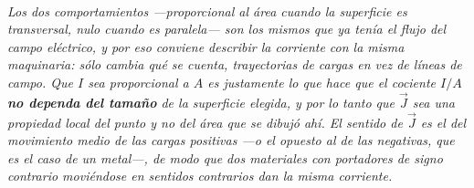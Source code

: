 \begin{center}
\begin{tikzpicture}[scale=0.95]
\end{tikzpicture}\\[0.5em]
{\small\itshape Los dos comportamientos ---proporcional al área cuando la
superficie es transversal, nulo cuando es paralela--- son los mismos que ya
tenía el flujo del campo eléctrico, y por eso conviene describir la corriente
con la misma maquinaria: sólo cambia qué se cuenta, trayectorias de cargas en
vez de líneas de campo. Que $I$ sea proporcional a $A$ es justamente lo que
hace que el cociente $I/A$ \textbf{no dependa del tamaño} de la superficie
elegida, y por lo tanto que $\vec J$ sea una propiedad \emph{local} del punto y
no del área que se dibujó ahí. El sentido de $\vec J$ es el del movimiento
\emph{medio} de las cargas positivas ---o el opuesto al de las negativas, que
es el caso de un metal---, de modo que dos materiales con portadores de signo
contrario moviéndose en sentidos contrarios dan la \emph{misma} corriente.}
\end{center}
